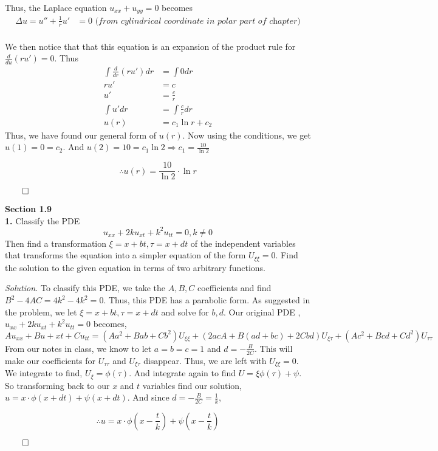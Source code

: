 \documentclass{article}
\begin{document}
Thus, the Laplace equation \(u_{xx} + u_{yy} =0\) becomes 
\begin{align*}
\Delta u = u'' + \frac{1}{r}u' &= 0   \textit{ (from cylindrical coordinate in polar part of chapter)} \\
\end{align*}
 
 We then notice that that this equation is an expansion of the product rule for \(\frac{d}{du} (ru') = 0 \). Thus
\begin{align*}
  \int  \frac{d}{dr} (ru') dr &= \int 0 dr  \\
  ru' &= c \\
  u' &= \frac{c}{r} \\
  \int u' dr &=\int  \frac{c}{r} dr\\
  u(r) &= c_1 \ln r + c_2 
\end{align*}
Thus, we have found our general form of \(u(r) \). Now using the conditions, we get \(u(1)= 0 = c_2 \). And \(u(2)=10= c_1 \ln 2 \Rightarrow  c_1 = \frac{10 }{\ln 2}\)

\[ \therefore  u(r) =  \frac{10 }{\ln 2} \cdot \ln r \]
\begin{flushright}
\( \qed \)
\end{flushright}


\textbf{Section 1.9}\\
\textbf{1.} Classify the PDE
\[
u_{xx} + 2ku_{xt} + k^2 u_{tt} = 0,  k \neq 0
\]
Then find a transformation \(\xi= x+bt, \tau = x + dt\) of the independent variables that transforms the equation into a simpler equation of the form \(U_{\xi \xi} = 0\). Find the solution to the given equation in terms of two arbitrary functions. 

\vspace{3mm}
\textit{Solution.}  To classify this PDE, we take the \( A,B,C\) coefficients and find \(B^2 -4AC = 4k^2-4k^2 = 0\). Thus, this PDE has a parabolic form. As suggested in the problem, we let  \(\xi= x+bt, \tau = x + dt\) and solve for \(b,d\). Our original PDE , \(u_{xx} + 2ku_{xt} + k^2 u_{tt} = 0\) becomes, 
\[
Au_{xx} + Bu+{xt}+Cu_{tt} = (Aa^2 + Bab + Cb^2) U_{\xi \xi} + (2acA+B(ad+bc) + 2Cbd)U_{\xi \tau}
+(Ac^2 + Bcd+Cd^2)U_{\tau \tau} 
\]
From our notes in class, we know to let \(a=b=c=1\) and \(d= -\frac{B}{2C}\). This will make our coefficients for \( U_{\tau \tau} \) and \( U_{\xi \tau} \) disappear. Thus, we are left with \( U_{\xi \xi} = 0\). We integrate to find, 
\( U_{\xi} = \phi(\tau) \). And integrate again to find \( U = \xi \phi(\tau) + \psi \). So transforming back to our \(x\) and \(t\) variables find our solution, \( u= x\cdot \phi(x+dt) + \psi( x+ dt) \). And since \(d=-\frac{B}{2C} =\frac{1}{k}\), 

\[
\therefore u = x\cdot \phi(x-\frac{t}{k}) + \psi( x-\frac{t}{k} )  
\] 


\begin{flushright}
\( \qed \)
\end{flushright}
\end{document}
